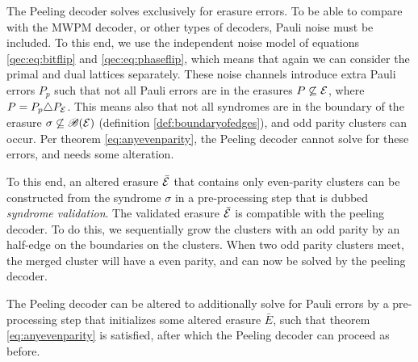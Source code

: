 The Peeling decoder solves exclusively for erasure errors. To be able to compare with the MWPM decoder, or other types of decoders, Pauli noise must be included. To this end, we use the independent noise model of equations \ref{qec:eq:bitflip} and \ref{qec:eq:phaseflip}, which means that again we can consider the primal and dual lattices separately. These noise channels introduce extra Pauli errors $P_p$ such that not all Pauli errors are in the erasures $P\not\subseteq \mathcal{E}$, where $P = P_p\triangle P_{\mathcal{E}}$. This means also that not all syndromes are in the boundary of the erasure $\sigma \not\subseteq \mathscr{B}(\mathcal{E})$ (definition \ref{def:boundaryofedges}), and odd parity clusters can occur. Per theorem \ref{eq:anyevenparity}, the Peeling decoder cannot solve for these errors, and needs some alteration.

To this end, an altered erasure $\bar{\mathcal{E}}$ that contains only even-parity clusters can be constructed from the syndrome $\sigma$ in a pre-processing step that is dubbed \emph{syndrome validation}. The validated erasure $\bar{\mathcal{E}}$ is compatible with the peeling decoder. To do this, we sequentially grow the clusters with an odd parity by an half-edge on the boundaries on the clusters. When two odd parity clusters meet, the merged cluster will have a even parity, and can now be solved by the peeling decoder. 
\begin{proposition}
  The Peeling decoder can be altered to additionally solve for Pauli errors by a pre-processing step that initializes some altered erasure $\bar{E}$, such that theorem \ref{eq:anyevenparity} is satisfied, after which the Peeling decoder can proceed as before. 
\end{proposition}

